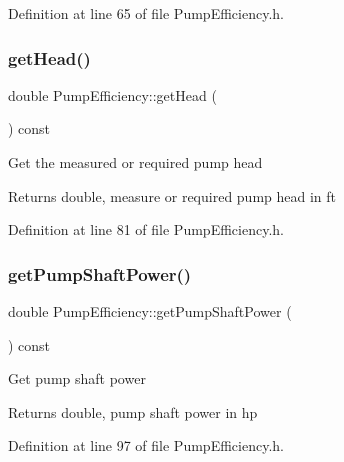 Definition at line 65 of file Pump\+Efficiency.\+h.

\mbox{\label{class_pump_efficiency_aa89f7727e67b3e0d20149eee66d10f69}} 
\subsubsection{\texorpdfstring{get\+Head()}{getHead()}}
{\footnotesize\ttfamily double Pump\+Efficiency\+::get\+Head (\begin{DoxyParamCaption}{ }\end{DoxyParamCaption}) const\hspace{0.3cm}{\ttfamily [inline]}}

Get the measured or required pump head \begin{DoxyReturn}{Returns}
double, measure or required pump head in ft 
\end{DoxyReturn}


Definition at line 81 of file Pump\+Efficiency.\+h.

\mbox{\label{class_pump_efficiency_aeb6d4f2cce565fbe834d71c7a52b87d1}} 
\subsubsection{\texorpdfstring{get\+Pump\+Shaft\+Power()}{getPumpShaftPower()}}
{\footnotesize\ttfamily double Pump\+Efficiency\+::get\+Pump\+Shaft\+Power (\begin{DoxyParamCaption}{ }\end{DoxyParamCaption}) const\hspace{0.3cm}{\ttfamily [inline]}}

Get pump shaft power \begin{DoxyReturn}{Returns}
double, pump shaft power in hp 
\end{DoxyReturn}


Definition at line 97 of file Pump\+Efficiency.\+h.

\mbox{\label{class_pump_efficiency_a6eeeabb70d99a79a636f35ca74d8ec05}} 
